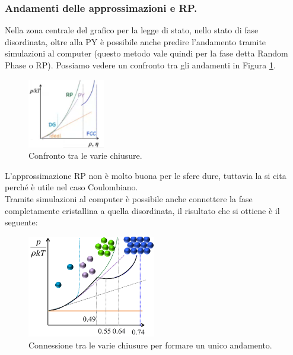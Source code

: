 \subsubsection{Andamenti delle approssimazioni e RP.}
\label{subsubsec:Andamenti delle approssimazioni e RP.}
Nella zona centrale del grafico per la legge di stato, nello stato di fase disordinata, oltre alla PY è possibile anche predire l'andamento tramite simulazioni al computer (questo metodo vale quindi per la fase detta Random Phase o RP). Possiamo vedere un confronto tra gli andamenti in Figura \ref{fig:chiusure-confronto}.
\begin{figure}[ht]
	\centering
	\includegraphics[width=0.3\textwidth]{figures/Confronto-chiusure.png}
	\caption{Confronto tra le varie chiusure.}
	\label{fig:chiusure-confronto}
\end{figure}
L'approssimazione RP non è molto buona per le sfere dure, tuttavia la si cita perché è utile nel caso Coulombiano.\\
Tramite simulazioni al computer è possibile anche connettere la fase completamente cristallina a quella disordinata, il risultato che si ottiene è il seguente:
\begin{figure}[H]
	\centering
	\includegraphics[width=0.5\textwidth]{figures/connessione-RP-PY-BG.png}
	\caption{Connessione tra le varie chiusure per formare un unico andamento.}
	\label{fig:PY-RP-BG}
\end{figure}
